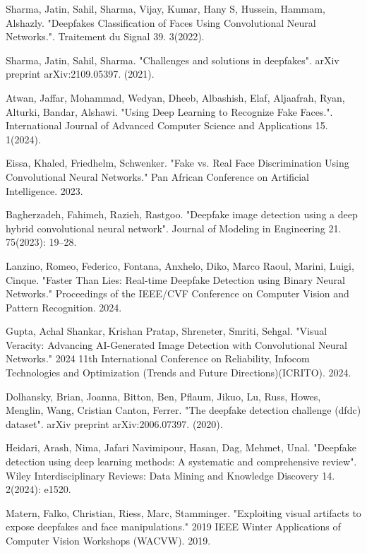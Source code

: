 \documentclass{svproc}
\begin{document}
\begin{thebibliography}{6}
Sharma, Jatin, Sahil, Sharma, Vĳay, Kumar, Hany S, Hussein, Hammam, Alshazly. "Deepfakes Classification of Faces Using Convolutional Neural Networks.". Traitement du Signal 39. 3(2022).

	Sharma, Jatin, Sahil, Sharma. "Challenges and solutions in deepfakes". arXiv preprint arXiv:2109.05397. (2021).

Atwan, Jaffar, Mohammad, Wedyan, Dheeb, Albashish, Elaf, Aljaafrah, Ryan, Alturki, Bandar, Alshawi. "Using Deep Learning to Recognize Fake Faces.". International Journal of Advanced Computer Science and Applications 15. 1(2024).

Eissa, Khaled, Friedhelm, Schwenker. "Fake vs. Real Face Discrimination Using Convolutional Neural Networks." Pan African Conference on Artificial Intelligence. 2023.

Bagherzadeh, Fahimeh, Razieh, Rastgoo. "Deepfake image detection using a deep hybrid convolutional neural network". Journal of Modeling in Engineering 21. 75(2023): 19–28.

Lanzino, Romeo, Federico, Fontana, Anxhelo, Diko, Marco Raoul, Marini, Luigi, Cinque. "Faster Than Lies: Real-time Deepfake Detection using Binary Neural Networks." Proceedings of the IEEE/CVF Conference on Computer Vision and Pattern Recognition. 2024.

Gupta, Achal Shankar, Krishan Pratap, Shreneter, Smriti, Sehgal. "Visual Veracity: Advancing AI-Generated Image Detection with Convolutional Neural Networks." 2024 11th International Conference on Reliability, Infocom Technologies and Optimization (Trends and Future Directions)(ICRITO). 2024.

Dolhansky, Brian, Joanna, Bitton, Ben, Pflaum, Jikuo, Lu, Russ, Howes, Menglin, Wang, Cristian Canton, Ferrer. "The deepfake detection challenge (dfdc) dataset". arXiv preprint arXiv:2006.07397. (2020).

Heidari, Arash, Nima, Jafari Navimipour, Hasan, Dag, Mehmet, Unal. "Deepfake detection using deep learning methods: A systematic and comprehensive review". Wiley Interdisciplinary Reviews: Data Mining and Knowledge Discovery 14. 2(2024): e1520.

Matern, Falko, Christian, Riess, Marc, Stamminger. "Exploiting visual artifacts to expose deepfakes and face manipulations." 2019 IEEE Winter Applications of Computer Vision Workshops (WACVW). 2019.


\end{thebibliography}
\end{document}
